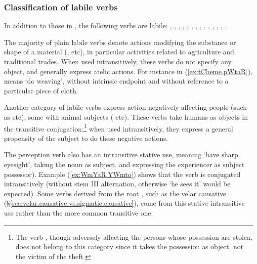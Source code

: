 \subsubsection{Classification of labile verbs} \label{sec:lability.categories}
In addition to those in , the following verbs are labile: , , , , , , , , ,  , , , , . 

 
The majority of plain labile verbs denote actions modifying the substance or shape of a material (,  etc), in particular activities related to agriculture and traditional trades. When used intransitively, these verbs do not specify any object, and generally express atelic actions. For instance in (\ref{ex:tCheme.pWtaR}),  means `do weaving', without intrinsic endpoint and without reference to a particular piece of cloth.

Another category of labile verbs express action negatively affecting people (such as  etc), some with animal subjects ( etc).  These verbs take humans as objects in the transitive conjugation;\footnote{The verb , though adversely affecting the persons whose possession are stolen, does not belong to this category since it takes the possession as object, not the victim of the theft.} when used intransitively, they express a general propensity of the subject to do these negative actions.


The perception verb  also has an intransitive stative use, meaning `have sharp eyesight', taking the noun  as subject, and expressing the experiencer as subject possessor). Example (\ref{ex:WmYaR.YWmto}) shows that the verb  is conjugated intransitively (without stem III alternation, otherwise  `he sees it' would be expected). Some verbs derived from the root , such as the velar causative  (§\ref{sec:velar.causative.vs.sigmatic.causative}), come from this stative intransitive use rather than the more common transitive one.

